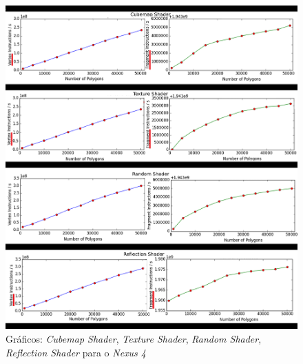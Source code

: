 	\begin{figure}[ht]
	\centering
		\includegraphics[keepaspectratio=true,scale=0.55]{figuras/cubeplot.png}
	\caption{Gráficos: \textit{Cubemap Shader}, \textit{Texture Shader}, \textit{Random Shader}, \textit{Reflection Shader} para o \textit{Nexus 4}}
	\label{nexus2}
	\end{figure}


